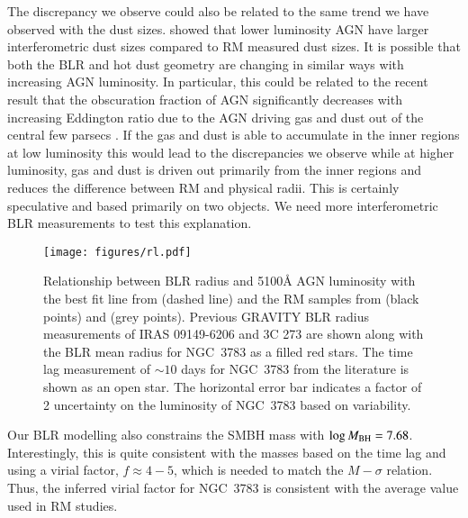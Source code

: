 \documentclass[longauth,]{aa}
\begin{document}
The discrepancy we observe could also be related to the same trend we have observed with the dust sizes.  showed that lower luminosity AGN have larger interferometric dust sizes compared to RM measured dust sizes. It is possible that both the BLR and hot dust geometry are changing in similar ways with increasing AGN luminosity. In particular, this could be related to the recent result that the obscuration fraction of AGN significantly decreases with increasing Eddington ratio due to the AGN driving gas and dust out of the central few parsecs \citep{Ricci:2017ek}. If the gas and dust is able to accumulate in the inner regions at low luminosity this would lead to the discrepancies we observe while at higher luminosity, gas and dust is driven out primarily from the inner regions and reduces the difference between RM and physical radii. This is certainly speculative and based primarily on two objects. We need more interferometric BLR measurements to test this explanation.

\begin{figure*}
    \centering
    \texttt{[image: figures/rl.pdf]}
    \caption{Relationship between BLR radius and 5100\AA{} AGN luminosity with the best fit line from \citet{Bentz:2013aa} (dashed line) and the RM samples from \citet{Du:2019aa} (black points) and \citet{Grier:2017aa} (grey points). Previous GRAVITY BLR radius measurements of IRAS 09149-6206 and 3C 273 are shown along with the BLR mean radius for NGC~3783 as a filled red stars. The time lag measurement of $\sim 10$ days for NGC~3783 from the literature is shown as an open star. The horizontal error bar indicates a factor of 2 uncertainty on the luminosity of NGC~3783 based on variability.}
    \label{fig:rl}
\end{figure*}

Our BLR modelling also constrains the SMBH mass with $\log M_{\rm BH} = 7.68$. Interestingly, this is quite consistent with the masses based on the time lag and using a virial factor, $f \approx 4-5$, which is needed to match the $M-\sigma$ relation. Thus, the inferred virial factor for NGC~3783 is consistent with the average value used in RM studies.
\end{document}

